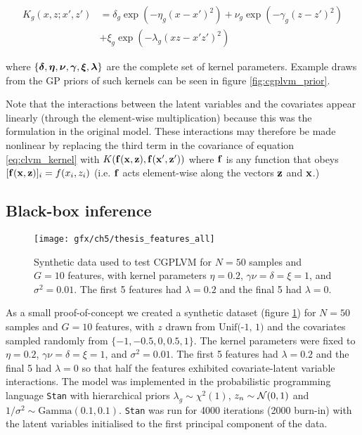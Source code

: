 \begin{equation}
  \begin{aligned}
  K_g(x, z; x', z') & =
  \delta_g \exp(-\eta_g (x - x')^2) +
  \nu_g \exp(-\gamma_g(z - z')^2) \\
  & + \xi_g \exp(-\lambda_g(xz - x'z')^2)
\end{aligned}
\end{equation}

where $\{\bm{\delta}, \bm{\eta}, \bm{\nu}, \bm{\gamma}, \bm{\xi}, \bm{\lambda}\}$ are the complete set of kernel parameters. Example draws from the GP priors of such kernels can be seen in figure \ref{fig:cgplvm_prior}.


Note that the interactions between the latent variables and the covariates appear linearly (through the element-wise multiplication) because this was the formulation in the original model. These interactions may therefore be made nonlinear by replacing the third term in the covariance of equation \ref{eq:clvm_kernel} with $K(\mathbf{f}(\mathbf{x}, \mathbf{z}), \mathbf{f}(\mathbf{x}', \mathbf{z}'))$ where $\mathbf{f}$ is any function that obeys $[\mathbf{f}(\mathbf{x}, \mathbf{z})]_i = f(x_i, z_i)$ (i.e. $\mathbf{f}$ acts element-wise along the vectors $\mathbf{z}$ and $\mathbf{x}$.)



\subsection{Black-box inference}


\begin{figure}
  \centering
\texttt{[image: gfx/ch5/thesis\_features\_all]}
\caption{Synthetic data used to test CGPLVM for $N=50$ samples and $G=10$ features, with kernel parameters $\eta = 0.2$, $\gamma \nu = \delta = \xi = 1$, and $\sigma^2 = 0.01$. The first 5 features had $\lambda = 0.2$ and the final 5 had $\lambda = 0$.} \label{fig:cgplvm_data}
\end{figure}

As a small proof-of-concept we created a synthetic dataset (figure \ref{fig:cgplvm_data}) for $N=50$ samples and $G=10$ features, with $z$ drawn from $\text{Unif(-1, 1)}$ and the covariates sampled randomly from $\{-1, -0.5, 0, 0.5, 1\}$. The kernel parameters were fixed to $\eta = 0.2$, $\gamma \nu = \delta = \xi = 1$, and $\sigma^2 = 0.01$. The first 5 features had $\lambda = 0.2$ and the final 5 had $\lambda = 0$ so that half the features exhibited covariate-latent variable interactions. The model was implemented in the probabilistic programming language \texttt{Stan} with hierarchical priors $\lambda_g \sim \chi^2(1)$, $z_n \sim \mathcal{N}(0,1)$ and $1 / \sigma^2 \sim \text{Gamma}(0.1, 0.1)$.
\texttt{Stan} was run for 4000 iterations (2000 burn-in) with the latent variables initialised to the first principal component of the data.



